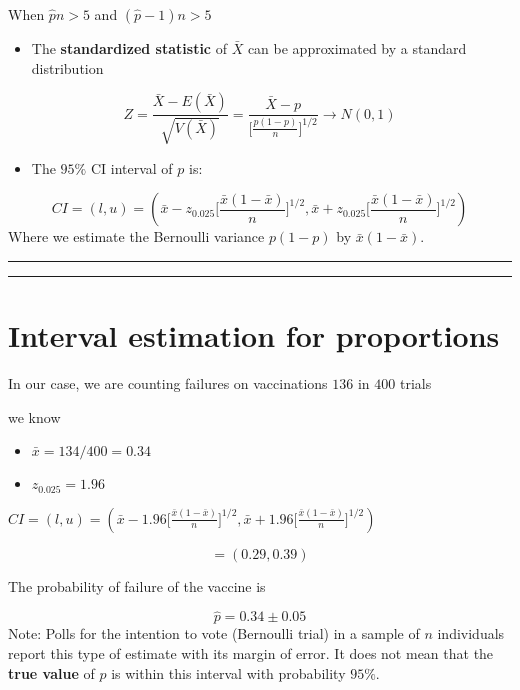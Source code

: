 \documentclass[
]{book}
\providecommand{\tightlist}{%
  \setlength{\itemsep}{0pt}\setlength{\parskip}{0pt}}
\begin{document}
When \(\hat{p}n>5\) and \((\hat{p}-1)n>5\)

\begin{itemize}
\tightlist
\item
  The \textbf{standardized statistic} of \(\bar{X}\) can be approximated by a standard distribution
\end{itemize}

\[Z=\frac{\bar{X}-E(\bar{X})}{\sqrt{V(\bar{X})}}= \frac{\bar{X}-p}{\big[\frac{p(1-p)}{n} \big]^{1/2}}\rightarrow N(0,1)\]

\begin{itemize}
\tightlist
\item
  The \(95\%\) CI interval of \(p\) is:
\end{itemize}

\[CI=(l,u)=(\bar{x}-z_{0.025}\big[\frac{\bar{x}(1-\bar{x})}{n} \big]^{1/2},  \bar{x}+z_{0.025}\big[\frac{\bar{x}(1-\bar{x})}{n} \big]^{1/2})\]
Where we estimate the Bernoulli variance \(p(1-p)\) by \(\bar{x}(1-\bar{x})\).

\begin{center}\rule{0.5\linewidth}{0.5pt}\end{center}

\begin{center}\rule{0.5\linewidth}{0.5pt}\end{center}

\hypertarget{interval-estimation-for-proportions-3}{%
\section{Interval estimation for proportions}\label{interval-estimation-for-proportions-3}}

In our case, we are counting failures on vaccinations \(136\) in \(400\) trials

we know

\begin{itemize}
\tightlist
\item
  \(\bar{x}=134/400=0.34\)
\item
  \(z_{0.025}=1.96\)
\end{itemize}

\(CI=(l,u)=(\bar{x}-1.96 \big[\frac{\bar{x}(1-\bar{x})}{n} \big]^{1/2}, \bar{x}+1.96 \big[\frac{\bar{x}(1-\bar{x})}{n} \big]^{1/2})\)

\[=(0.29,0.39)\]

The probability of failure of the vaccine is

\[\hat{p}=0.34 \pm 0.05\]
Note: Polls for the intention to vote (Bernoulli trial) in a sample of \(n\) individuals report this type of estimate with its margin of error. It does not mean that the \textbf{true value} of \(p\) is within this interval with probability \(95\%\).
\end{document}
